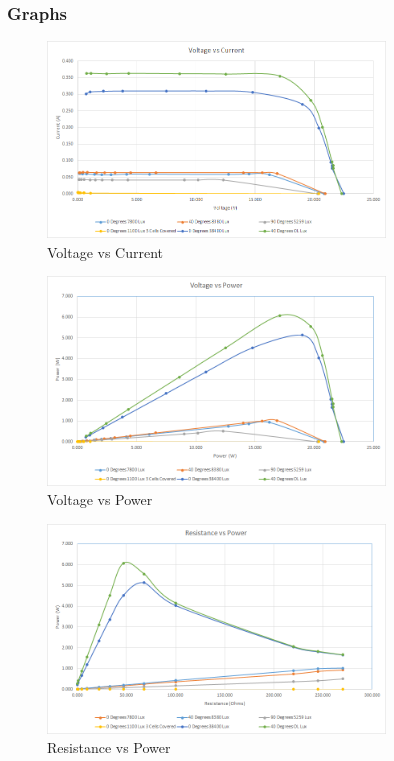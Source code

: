 \documentclass{article}
\begin{document}
	\subsubsection{Graphs}
		\begin{figure}[H]
			\centering
			\includegraphics[width=0.8\textwidth]{VoltagevsCurrent}
			\caption{Voltage vs Current}
			\label{fig:VoltagevsCurrent}
		\end{figure}
	
		\begin{figure}[H]
			\centering
			\includegraphics[width=0.8\textwidth]{VoltagevsPower}
			\caption{Voltage vs Power}
			\label{fig:VoltagevsPower}
		\end{figure}
	
		\begin{figure}[H]
			\centering
			\includegraphics[width=0.8\textwidth]{ResistancevsPower}
			\caption{Resistance vs Power}
			\label{fig:ResistancevsPower}
		\end{figure}
	
\end{document}
